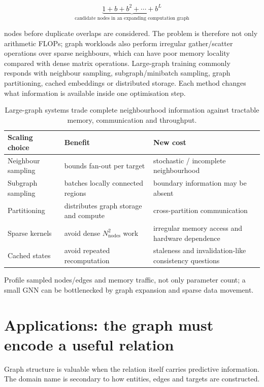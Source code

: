 \[
\underbrace{1+b+b^2+\cdots+b^L}_{\text{candidate nodes in an expanding computation graph}}
\]

nodes before duplicate overlaps are considered.
The problem is therefore not only arithmetic FLOPs; graph workloads also perform irregular gather/scatter operations over sparse neighbours, which can have poor memory locality compared with dense matrix operations.
Large-graph training commonly responds with neighbour sampling, subgraph/minibatch sampling, graph partitioning, cached embeddings or distributed storage.
Each method changes what information is available inside one optimisation step.

\begin{table}[htbp]
\centering
\small
\begin{tabular}{p{}p{}p{}}
\toprule
Scaling choice & Benefit & New cost \\
\midrule
Neighbour sampling & bounds fan-out per target & stochastic / incomplete neighbourhood \\
Subgraph sampling & batches locally connected regions & boundary information may be absent \\
Partitioning & distributes graph storage and compute & cross-partition communication \\
Sparse kernels & avoid dense $N_{\text{nodes}}^2$ work & irregular memory access and hardware dependence \\
Cached states & avoid repeated recomputation & staleness and invalidation-like consistency questions \\
\bottomrule
\end{tabular}
\caption{Large-graph systems trade complete neighbourhood information against tractable memory, communication and throughput.}
\label{tab:gnn-scaling}
\end{table}

\begin{calloutpracticaltip}
Profile sampled nodes/edges and memory traffic, not only parameter count; a small GNN can be bottlenecked by graph expansion and sparse data movement.
\end{calloutpracticaltip}

\section{Applications: the graph must encode a useful relation}
Graph structure is valuable when the relation itself carries predictive information.
The domain name is secondary to how entities, edges and targets are constructed.

